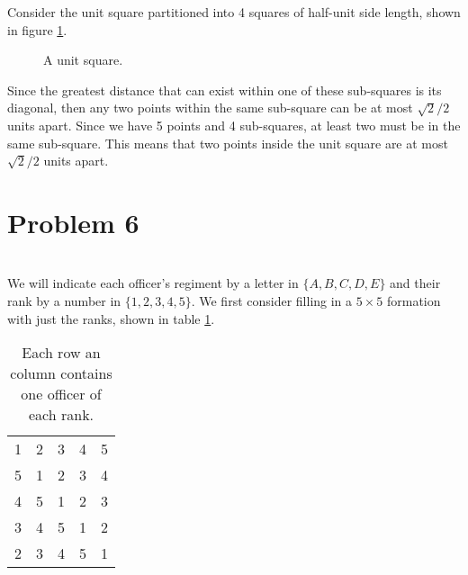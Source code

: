 \documentclass[12pt]{article}
\begin{document}
Consider the unit square partitioned into 4 squares of half-unit side length, shown in figure \ref{fig:square}.

\begin{figure}[ht]
    \centering
    \caption{A unit square.}
    \label{fig:square}
\end{figure}

Since the greatest distance that can exist within one of these sub-squares is its diagonal, then any two points within the same sub-square can be at most $\sqrt{2}/2$ units apart. Since we have 5 points and 4 sub-squares, at least two must be in the same sub-square. This means that two points inside the unit square are at most $\sqrt{2}/2$ units apart.


\newpage
\section*{Problem 6}
\\

We will indicate each officer's regiment by a letter in $\{A, B, C, D, E\}$ and their rank by a number in $\{1,2,3,4,5\}$. We first consider filling in a $5\times 5$ formation with just the ranks, shown in table \ref{tab:ranks}.

\begin{table}[ht]
    \centering
    \begin{tabular}{ccccc}
        1 & 2 & 3 & 4 & 5 \\
        5 & 1 & 2 & 3 & 4 \\
        4 & 5 & 1 & 2 & 3 \\
        3 & 4 & 5 & 1 & 2 \\
        2 & 3 & 4 & 5 & 1 \\
    \end{tabular}
    \caption{Each row an column contains one officer of each rank.}
    \label{tab:ranks}
\end{table}
\end{document}
